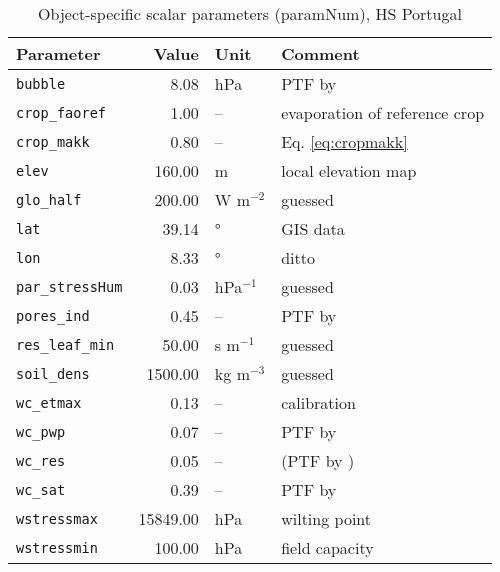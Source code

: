 \begin{table}[ht]
\centering
\caption{Object-specific scalar parameters (\textsf{paramNum}), HS Portugal} 
\label{tab:portugalHS_paramNum}
\begin{tabular}{lrll}
  \hline
Parameter & Value & Unit & Comment \\ 
  \hline
\verb!bubble! & 8.08 & hPa & PTF by \citet{rawls85} \\ 
  \verb!crop_faoref! & 1.00 & -- & evaporation of reference crop \\ 
  \verb!crop_makk! & 0.80 & -- & Eq. \eqref{eq:cropmakk} \\ 
  \verb!elev! & 160.00 & m & local elevation map \\ 
  \verb!glo_half! & 200.00 & W m$^{-2}$ & guessed \\ 
  \verb!lat! & 39.14 & ° & GIS data \\ 
  \verb!lon! & 8.33 & ° & ditto \\ 
  \verb!par_stressHum! & 0.03 & hPa$^{-1}$ & guessed \\ 
  \verb!pores_ind! & 0.45 & -- & PTF by \citet{rawls85} \\ 
  \verb!res_leaf_min! & 50.00 & s m$^{-1}$ & guessed \\ 
  \verb!soil_dens! & 1500.00 & kg m$^{-3}$ & guessed \\ 
  \verb!wc_etmax! & 0.13 & -- & calibration \\ 
  \verb!wc_pwp! & 0.07 & -- & PTF by \citet{rawls85} \\ 
  \verb!wc_res! & 0.05 & -- & (PTF by \citet{rawls85}) \\ 
  \verb!wc_sat! & 0.39 & -- & PTF by \citet{woesten99} \\ 
  \verb!wstressmax! & 15849.00 & hPa & wilting point \\ 
  \verb!wstressmin! & 100.00 & hPa & field capacity \\ 
   \hline
\end{tabular}
\end{table}
